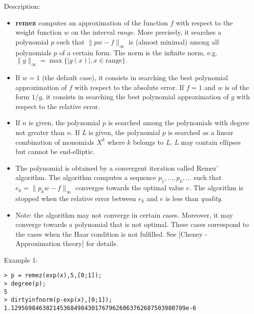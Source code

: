 \noindent Description: \begin{itemize}

\item \textbf{remez} computes an approximation of the function $f$ with respect to 
   the weight function $w$ on the interval \emph{range}. More precisely, it 
   searches a polynomial $p$ such that $\|pw-f\|_{\infty}$ is 
   (almost minimal) among all polynomials $p$ of a certain form. The norm is
   the infinite norm, e.g. $\|g\|_{\infty} = \max \{|g(x)|, x \in \mathrm{range}\}.$

\item If $w=1$ (the default case), it consists in searching the best 
   polynomial approximation of $f$ with respect to the absolute error.
   If $f=1$ and $w$ is of the form $1/g$, it consists in 
   searching the best polynomial approximation of $g$ with respect to the 
   relative error.

\item If $n$ is given, the polynomial $p$ is searched among the 
   polynomials with degree not greater than $n$.
   If \emph{L} is given, the polynomial $p$ is searched as a linear combination 
   of monomials $X^k$ where $k$ belongs to \emph{L}.
   \emph{L} may contain ellipses but cannot be end-elliptic.

\item The polynomial is obtained by a convergent iteration called Remez' algorithm. 
   The algorithm computes a sequence $p_1,\dots ,p_k,\dots$ 
   such that $e_k = \|p_k w-f\|_{\infty}$ converges towards 
   the optimal value $e$. The algorithm is stopped when the relative error 
   between $e_k$ and $e$ is less than \emph{quality}.

\item Note: the algorithm may not converge in certain cases. Moreover, it may 
   converge towards a polynomial that is not optimal. These cases correspond to 
   the cases when the Haar condition is not fulfilled.
   See [Cheney - Approximation theory] for details.
\end{itemize}
\noindent Example 1: 
\begin{center}\begin{minipage}{15cm}\begin{Verbatim}[frame=single]
> p = remez(exp(x),5,[0;1]);
> degree(p);
5
> dirtyinfnorm(p-exp(x),[0;1]);
1.12956984638214536849843017679626063762687503980789e-6
\end{Verbatim}
\end{minipage}\end{center}
